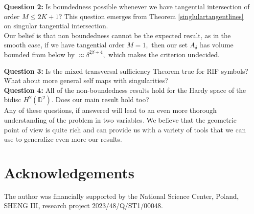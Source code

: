 \documentclass[12pt]{amsart}
\numberwithin{equation}{section}
\begin{document}
\textbf{Question 2:} Is boundedness possible whenever we have tangential intersection of order $M\leq 2K+1$? This question emerges from Theorem \ref{singlulartangentlines} on singular tangential intersection.\\

Our belief is that non boundedness cannot be the expected result, as in the smooth case, if we have tangential order $M=1,$ then our set $A_{\delta}$ has volume bounded from below by $\approx \delta^{2\beta+4},$ which makes the criterion undecided.

\textbf{Question 3:} Is the mixed transversal sufficiency Theorem true for RIF symbols? What about more general self maps with singularities?\\ 

\textbf{Question 4:} All of the non-boundedness results hold for the Hardy space of the bidisc $H^2(\mathbb{D}^2).$ Does our main result hold too?\\

Any of these questions, if answered will lead to an even more thorough understanding of the problem in two variables. We believe that the geometric point of view is quite rich and can provide us with a variety of tools that we can use to generalize even more our results.

\section{Acknowledgements} The author was financially supported by the National
Science Center, Poland, SHENG III, research project 2023/48/Q/ST1/00048.
\end{document}

